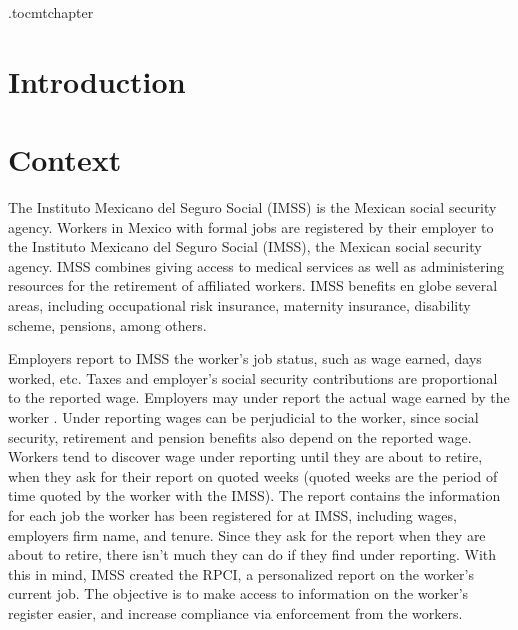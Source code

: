 \documentclass[oneside,11pt]{article}
\begin{document}








\newpage

\etocdepthtag.toc{mtchapter}



\section{Introduction}


\section{Context} \label{context}
The Instituto Mexicano del Seguro Social (IMSS) is the Mexican social security agency.  Workers in Mexico with formal jobs are registered by their employer to the Instituto Mexicano del Seguro Social (IMSS), the Mexican social security agency. IMSS combines giving access to medical services as well as administering resources for the retirement of affiliated workers. IMSS benefits en globe several areas, including occupational risk insurance, maternity insurance, disability scheme, pensions, among others.

Employers report to IMSS the worker's job status, such as wage earned, days worked, etc. Taxes and employer's social security contributions are proportional to the reported wage.  Employers may under report the actual wage earned by the worker \citep{kumler2020enlisting}. Under reporting wages can be perjudicial to the worker, since social security, retirement and pension benefits also depend on the reported wage. Workers tend to discover wage under reporting until they are about to retire, when they ask for their report on quoted weeks (quoted weeks are the period of time quoted by the worker with the IMSS). The report contains the information for each job the worker has been registered for at IMSS, including wages, employers firm name, and tenure. Since they ask for the report when they are about to retire, there isn't much they can do if they find under reporting. With this in mind, IMSS created the RPCI, a personalized report on the worker's current job. The objective is to make access to information on the worker's register easier, and increase compliance via enforcement from the workers.
\end{document}
